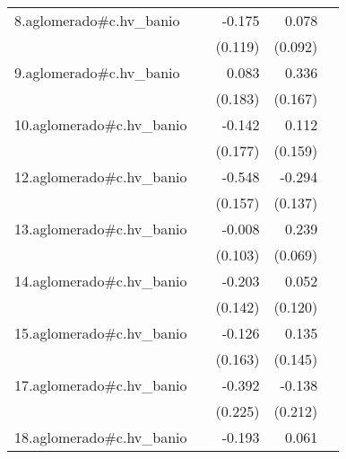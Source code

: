 {\begin{longtable}{l*{4}{D{.}{.}{-1}}}
\addlinespace
8.aglomerado#c.hv\_banio&                     &      -0.175         &       0.078         &                     \\
            &                     &     (0.119)         &     (0.092)         &                     \\
\addlinespace
9.aglomerado#c.hv\_banio&                     &       0.083         &       0.336\sym{*}  &                     \\
            &                     &     (0.183)         &     (0.167)         &                     \\
\addlinespace
10.aglomerado#c.hv\_banio&                     &      -0.142         &       0.112         &                     \\
            &                     &     (0.177)         &     (0.159)         &                     \\
\addlinespace
12.aglomerado#c.hv\_banio&                     &      -0.548\sym{***}&      -0.294\sym{*}  &                     \\
            &                     &     (0.157)         &     (0.137)         &                     \\
\addlinespace
13.aglomerado#c.hv\_banio&                     &      -0.008         &       0.239\sym{***}&                     \\
            &                     &     (0.103)         &     (0.069)         &                     \\
\addlinespace
14.aglomerado#c.hv\_banio&                     &      -0.203         &       0.052         &                     \\
            &                     &     (0.142)         &     (0.120)         &                     \\
\addlinespace
15.aglomerado#c.hv\_banio&                     &      -0.126         &       0.135         &                     \\
            &                     &     (0.163)         &     (0.145)         &                     \\
\addlinespace
17.aglomerado#c.hv\_banio&                     &      -0.392         &      -0.138         &                     \\
            &                     &     (0.225)         &     (0.212)         &                     \\
\addlinespace
18.aglomerado#c.hv\_banio&                     &      -0.193         &       0.061         &                     \\

\end{longtable}}
